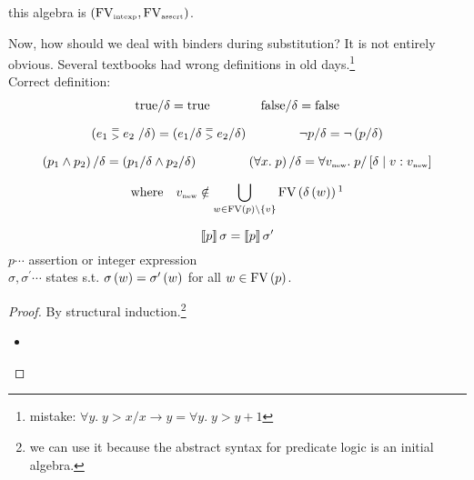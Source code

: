 \begin{enumcirc}
\begin{exercise}
		this algebra is $\left( \textrm{FV}_{\textrm{\tiny intexp}}, \textrm{FV}_{\textrm{\tiny assert}} \right)$.
	\end{exercise}
	\item
	Now, how should we deal with binders during substitution?
	It is not entirely obvious.
	Several textbooks had wrong definitions in old days.\footnote{ mistake:
		$\forall y .\; y > x / x \rightarrow y = \forall y .\; y > y + 1$ }\\
	Correct definition:\\
	\[
		\begin{array}{c}
			\true / \delta = \true \qquad \qquad \false / \delta = \false                                                    \\[1em]
			\prths{e_1 \;\twostack{=}{>}\; e_2 \; / \delta} = \prths{e_1 / \delta \;\twostack{=}{>}\; e_2 / \delta} \qquad \qquad
			\neg p / \delta = \neg \prths{p / \delta}                                                                        \\[1em]
			\prths{p_1 \wedge p_2} / \delta = \prths{p_1 / \delta \wedge p_2 / \delta} \qquad \qquad
			\prths{\forall x .\; p} / \delta = \forall v_{\textrm{\tiny new}} .\; p / \aug{\delta}{v:v_{\textrm{\tiny new}}} \\[1em]
			\displaystyle
			\textrm{where} \quad v_{\textrm{\tiny new}} \notin
			\bigcup_{w \in \textrm{FV}\prths{p} \backslash \braces{v}}
			\textrm{FV}\prths{\delta\prths{w}}\footnotemark
		\end{array}
	\]
	\begin{property}[Coincidence]
		\[
			\left\llbracket p \right\rrbracket\sigma = \left\llbracket p \right\rrbracket\sigma^\prime
		\]
		$p \cdots$ assertion or integer expression \\
		$\sigma, \sigma^\prime \cdots$ states s.t.
		$\sigma\left( w \right) = \sigma^\prime\left( w \right)$ for all $w \in \textrm{FV}\left( p \right)$.
	\end{property}
	\begin{proof}
		By structural induction.\footnote{
			we can use it because the abstract syntax for predicate logic is an initial algebra.
		}
		\begin{itemize}
			\item

\end{itemize}
\end{proof}
\end{enumcirc}
